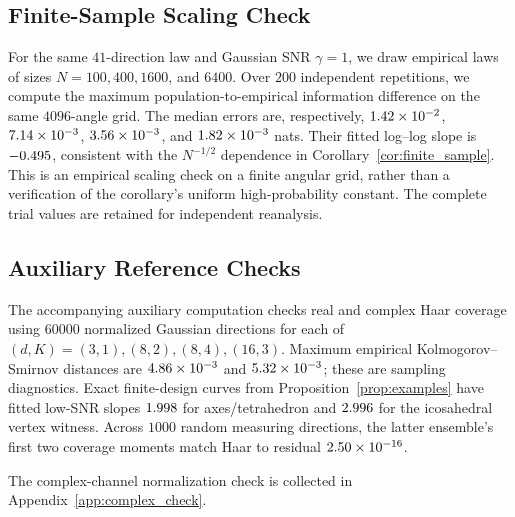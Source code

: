 

\subsection{Finite-Sample Scaling Check}
For the same $41$-direction law and Gaussian SNR $\gamma=1$, we draw empirical
laws of sizes $N=100,400,1600$, and $6400$. Over $200$ independent repetitions,
we compute the maximum population-to-empirical information difference on the
same $4096$-angle grid. The median errors are, respectively,
$1.42\times10^{-2}$, $7.14\times10^{-3}$, $3.56\times10^{-3}$, and
$1.82\times10^{-3}$ nats. Their fitted log--log slope is
$-0.495$, consistent with the $N^{-1/2}$ dependence in
Corollary~\ref{cor:finite_sample}. This is an empirical scaling check on a
finite angular grid, rather than a verification of the corollary's uniform
high-probability constant. The complete trial values are retained for
independent reanalysis.

\subsection{Auxiliary Reference Checks}
The accompanying auxiliary computation checks real and complex Haar coverage using $60000$ normalized Gaussian directions for each of $(d,K)=(3,1),(8,2),(8,4),(16,3)$. Maximum empirical Kolmogorov--Smirnov distances are $4.86\times10^{-3}$ and $5.32\times10^{-3}$; these are sampling diagnostics. Exact finite-design curves from Proposition~\ref{prop:examples} have fitted low-SNR slopes $1.998$ for axes/tetrahedron and $2.996$ for the icosahedral vertex witness. Across $1000$ random measuring directions, the latter ensemble's first two coverage moments match Haar to residual $2.50\times10^{-16}$.

The complex-channel normalization check is collected in Appendix~\ref{app:complex_check}.
